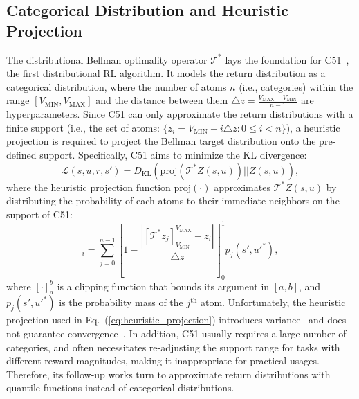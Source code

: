 \documentclass[twoside,11pt]{article}
\newcommand{\state}{s}
\newcommand{\action}{u}
\newcommand{\reward}{r}
\newcommand{\loss}{\mathcal{L}}
\newcommand{\utility}{Z}
\begin{document}
\subsection{Categorical Distribution and Heuristic Projection}

The distributional Bellman optimality operator $\mathcal{T}^*$ lays the foundation for C51~\citep{Bellemare2017C51}, the first distributional RL algorithm. It models the return distribution as a categorical distribution, where the number of atoms $n$ (i.e., categories) within the range $[V_\mathrm{MIN}, V_\mathrm{MAX}]$ and the distance between them $\triangle z=\frac{V_\mathrm{MAX}-V_\mathrm{MIN}}{n-1}$ are hyperparameters.
Since C51 can only approximate the return distributions with a finite support (i.e., the set of atoms: $\{z_i = V_\mathrm{MIN} + i\triangle z : 0\le i < n\}$), a heuristic projection is required to project the Bellman target distribution onto the pre-defined support.
Specifically, C51 aims to minimize the KL divergence:
\begin{equation}
\loss{}(\state{},\action{},\reward{},\state{}') = D_{\mathrm{KL}}(\mathrm{proj}(\mathcal{T}^* \utility{}(\state{},\action{}))||\utility{}(\state{},\action)),
\end{equation}
where the heuristic projection function $\mathrm{proj}(\cdot)$ approximates $\mathcal{T}^* \utility{}(\state{},\action{})$ by distributing the probability of each atoms to their immediate neighbors on the support of C51:
\begin{equation}
[\mathrm{proj}(\mathcal{T}^* \utility{}(\state{},\action{}))]_i = \sum_{j=0}^{n-1} \left[1-\frac{|[\mathcal{T}^* z_j]^{V_\mathrm{MAX}}_{V_\mathrm{MIN}} - z_i|}{\triangle z}\right]^1_0 p_j(\state{}',\action{}'^*),
\label{eq:heuristic_projection}
\end{equation}
where $[\cdot]_a^b$ is a clipping function that bounds its argument in $[a,b]$, and $p_j(\state{}',\action{}'^*)$ is the probability mass of the $j^{\mathrm{th}}$ atom. Unfortunately, the heuristic projection used in Eq.~(\ref{eq:heuristic_projection}) introduces variance~\citep{Rowland2019ER-DQN} and does not guarantee convergence~\citep{Dabney2018QR-DQN}. 
In addition, C51 usually requires a large number of categories, and often necessitates re-adjusting the support range for tasks with different reward magnitudes, making it inappropriate for practical usages.
Therefore, its follow-up works turn to approximate return distributions with quantile functions instead of categorical distributions.
\end{document}
